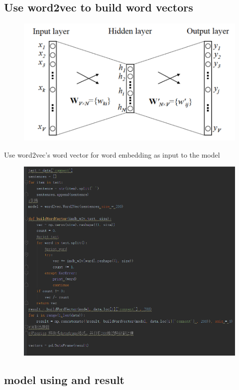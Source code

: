 \documentclass{article}
\begin{document}
\subsection{Use word2vec to build word vectors}
 \begin{figure}[H]
\centering
  \includegraphics[width=.8\textwidth]{3-4.png} %
  \end{figure}
Use word2vec's word vector for word embedding as input to the model
 \begin{figure}[H]
\centering
  \includegraphics[width=.8\textwidth]{3-5.png} %
  \end{figure}
\subsection{model using and result}
\end{document}
